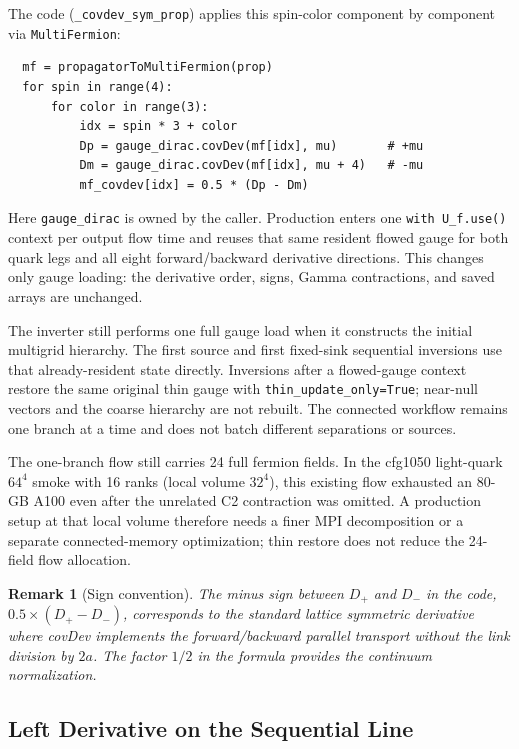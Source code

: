 \documentclass[11pt,a4paper]{article}
\newtheorem{remark}{Remark}
\newcommand{\code}[1]{\texttt{#1}}
\begin{document}
The code (\code{\_covdev\_sym\_prop}) applies this spin-color component by component via \code{MultiFermion}:

\begin{verbatim}
  mf = propagatorToMultiFermion(prop)
  for spin in range(4):
      for color in range(3):
          idx = spin * 3 + color
          Dp = gauge_dirac.covDev(mf[idx], mu)       # +mu
          Dm = gauge_dirac.covDev(mf[idx], mu + 4)   # -mu
          mf_covdev[idx] = 0.5 * (Dp - Dm)
\end{verbatim}

Here \code{gauge\_dirac} is owned by the caller.  Production enters one
\code{with U\_f.use()} context per output flow time and reuses that same
resident flowed gauge for both quark legs and all eight forward/backward
derivative directions.  This changes only gauge loading: the derivative order,
signs, Gamma contractions, and saved arrays are unchanged.

The inverter still performs one full gauge load when it constructs the initial
multigrid hierarchy.  The first source and first fixed-sink sequential
inversions use that already-resident state directly.  Inversions after a
flowed-gauge context restore the same original thin gauge with
\code{thin\_update\_only=True}; near-null vectors and the coarse hierarchy are
not rebuilt.  The connected workflow remains one branch at a time and does not
batch different separations or sources.

The one-branch flow still carries 24 full fermion fields.  In the cfg1050
light-quark $64^4$ smoke with 16 ranks (local volume $32^4$), this existing
flow exhausted an 80-GB A100 even after the unrelated C2 contraction was
omitted.  A production setup at that local volume therefore needs a finer MPI
decomposition or a separate connected-memory optimization; thin restore does
not reduce the 24-field flow allocation.

\begin{remark}[Sign convention]
The minus sign between $D_{+}$ and $D_{-}$ in the code, $0.5 \times (D_{+} - D_{-})$, corresponds to the standard lattice symmetric derivative where covDev implements the forward/backward parallel transport without the link division by $2a$. The factor $1/2$ in the formula provides the continuum normalization.
\end{remark}

\subsection{Left Derivative on the Sequential Line}
\label{sec:left_covdev}
\end{document}
